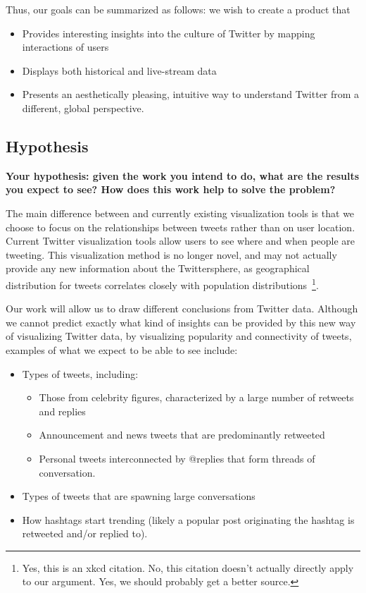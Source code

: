 Thus, our goals can be summarized as follows: we wish to create a product that
\begin{itemize}[noitemsep]
\item Provides interesting insights into the culture of Twitter by mapping interactions of users
\item Displays both historical and live-stream data
\item Presents an aesthetically pleasing, intuitive way to understand Twitter from a different, global perspective.
\end{itemize}

\subsection{Hypothesis} \label{sec:hypothesis}
\textbf{Your hypothesis: given the work you intend to do, what are the results you expect to see? How does this work help to solve the problem?}

The main difference between \sys and currently existing visualization tools is that we choose
to focus on the relationships between tweets rather than on user location. Current Twitter visualization tools
allow users to see where and when people are tweeting. This visualization method is no longer novel, and may not actually provide
any new information about the Twittersphere, as geographical distribution for tweets correlates closely with population
distributions~\cite{xkcd-heatmap}\footnote{Yes, this is an xkcd citation. No, this citation doesn't actually directly apply
to our argument. Yes, we should probably get a better source.}.

Our work will allow us to draw different conclusions from Twitter
data. Although we cannot predict exactly what kind of insights can be provided by this new way of visualizing Twitter data,
by visualizing popularity and connectivity of tweets, examples of what we expect to be able to see include:
\begin{itemize}[noitemsep]
\item Types of tweets, including:
\begin{itemize}[noitemsep, nolistsep]
\item Those from celebrity figures, characterized by a large number of retweets and replies
\item Announcement and news tweets that are predominantly retweeted
\item Personal tweets interconnected by @replies that form threads of conversation.
\end{itemize}
\item Types of tweets that are spawning large conversations
\item How hashtags start trending (likely a popular post originating the hashtag is retweeted and/or replied to).
\end{itemize}


